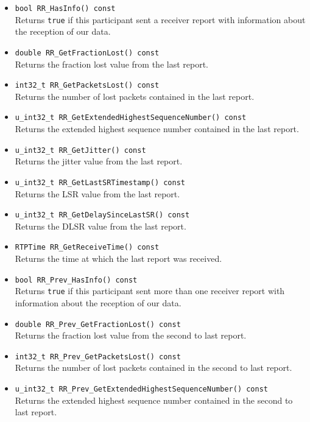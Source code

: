 \documentclass[12pt,a4paper]{article}
\begin{document}
\begin{itemize}
					\item {\tt bool RR\_HasInfo() const}\\
						Returns {\tt true} if this participant sent a receiver report with information
						about the reception of our data.
					\item {\tt double RR\_GetFractionLost() const}\\
						Returns the fraction lost value from the last report.
					\item {\tt int32\_t	RR\_GetPacketsLost() const}\\
						Returns the number of lost packets contained in the last report.
					\item {\tt u\_int32\_t RR\_GetExtendedHighestSequenceNumber() const}\\
						Returns the extended highest sequence number contained in the last report.
					\item {\tt u\_int32\_t RR\_GetJitter() const}\\
						Returns the jitter value from the last report.
					\item {\tt u\_int32\_t RR\_GetLastSRTimestamp() const}\\
						Returns the LSR value from the last report.
					\item {\tt u\_int32\_t RR\_GetDelaySinceLastSR() const}\\
						Returns the DLSR value from the last report.
					\item {\tt RTPTime RR\_GetReceiveTime() const}\\
						Returns the time at which the last report was received.
					\item {\tt bool RR\_Prev\_HasInfo() const}\\
						Returns {\tt true} if this participant sent more than one receiver report with information
						about the reception of our data.
					\item {\tt double RR\_Prev\_GetFractionLost() const}\\
						Returns the fraction lost value from the second to last report.
					\item {\tt int32\_t	RR\_Prev\_GetPacketsLost() const}\\
						Returns the number of lost packets contained in the second to last report.
					\item {\tt u\_int32\_t RR\_Prev\_GetExtendedHighestSequenceNumber() const}\\
						Returns the extended highest sequence number contained in the second to last report.

\end{itemize}
\end{document}

